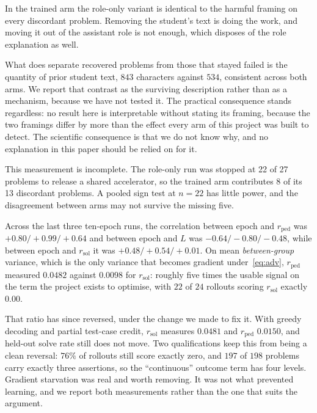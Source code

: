 In the trained arm the role-only variant is identical to the harmful framing on
every discordant problem. Removing the student's text is doing the work, and
moving it out of the assistant role is not enough, which disposes of the role
explanation as well.

What does separate recovered problems from those that stayed failed is the
quantity of prior student text, $843$ characters against $534$, consistent
across both arms. We report that contrast as the surviving description rather
than as a mechanism, because we have not tested it. The practical consequence
stands regardless: no result here is interpretable without stating its framing,
because the two framings differ by more than the effect every arm of this
project was built to detect. The scientific consequence is that we do not know
why, and no explanation in this paper should be relied on for it.

This measurement is incomplete. The role-only run was stopped at 22 of 27
problems to release a shared accelerator, so the trained arm contributes 8 of
its 13 discordant problems. A pooled sign test at $n{=}22$ has little power, and
the disagreement between arms may not survive the missing five.


%
Across the last three ten-epoch runs, the correlation between epoch and
$r_{\mathrm{ped}}$ was $+0.80/+0.99/+0.64$ and between epoch and $L$ was
$-0.64/-0.80/-0.48$, while between epoch and $r_{\mathrm{sol}}$ it was
$+0.48/+0.54/+0.01$. On mean \emph{between-group} variance, which is the only
variance that becomes gradient under~\eqref{eq:adv}, $r_{\mathrm{ped}}$ measured
$0.0482$ against $0.0098$ for $r_{\mathrm{sol}}$: roughly five times the usable
signal on the term the project exists to optimise, with $22$ of $24$ rollouts
scoring $r_{\mathrm{sol}}$ exactly $0.00$.

That ratio has since reversed, under the change we made to fix it. With greedy
decoding and partial test-case credit, $r_{\mathrm{sol}}$ measures $0.0481$ and
$r_{\mathrm{ped}}$ $0.0150$, and held-out solve rate still does not move. Two
qualifications keep this from being a clean reversal: $76\%$ of rollouts still
score exactly zero, and $197$ of $198$ problems carry exactly three assertions,
so the ``continuous'' outcome term has four levels. Gradient starvation was real
and worth removing. It was not what prevented learning, and we report both
measurements rather than the one that suits the argument.


